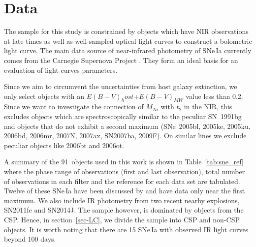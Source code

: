 \documentclass[useAMS,usenatbib ]{mn2e}
\begin{document}
\section{Data} 
\label{sec:data}
%


The sample for this study is constrained by objects which have NIR observations at late times as well as well-sampled optical light curves to
construct a bolometric light curve. The main data source of
near-infrared photometry of SNe\,Ia currently comes from the Carnegie
Supernova Project \citep[CSP;][]{Contreras2010,Burns2011,Stritzinger2011,Phillips2012,Burns2014}.
They form an ideal basis for an evaluation of light curves parameters.

Since we aim to circumvent the uncertainties from host galaxy extinction, we only select objects with an $E(B-V)_host$+$E(B-V)_{MW}$ value
less than 0.2. Since we want to investigate the connection of $M_{Ni}$ with $t_2$ in the NIR, this excludes objects which are spectroscopically similar  
to the
peculiar SN~1991bg \citep{Filippenko1992, Leibundgut1993, Mazzali1997} and
objects that do not exhibit a second maximum
(SNe~2005bl, 2005ke, 2005ku, 2006bd, 2006mr, 2007N, 2007ax, SN2007ba,
2009F). On similar lines we exclude peculiar objects like 2006bt and 2006ot. 


\iffalse
A summary of the 91~objects used in this work is shown in
Table~\ref{tab:sne_ref} where the phase range of observations
(first and last observation), total number of observations in each
filter and the reference for each data set are tabulated. Twelve of these SNe\,Ia
have been discussed by \citet{BN12} and have data only near the first
maximum. We also include IR photometry from two recent nearby
explosions, SN2011fe and SN2014J. The sample however, is dominated by objects
from the CSP. Hence, in section~\ref{sec-LC}, we divide the sample
into CSP and non-CSP objects. It is worth noting that there are 15 SNe\,Ia
with observed IR light curves beyond 100 days.
\end{document}
